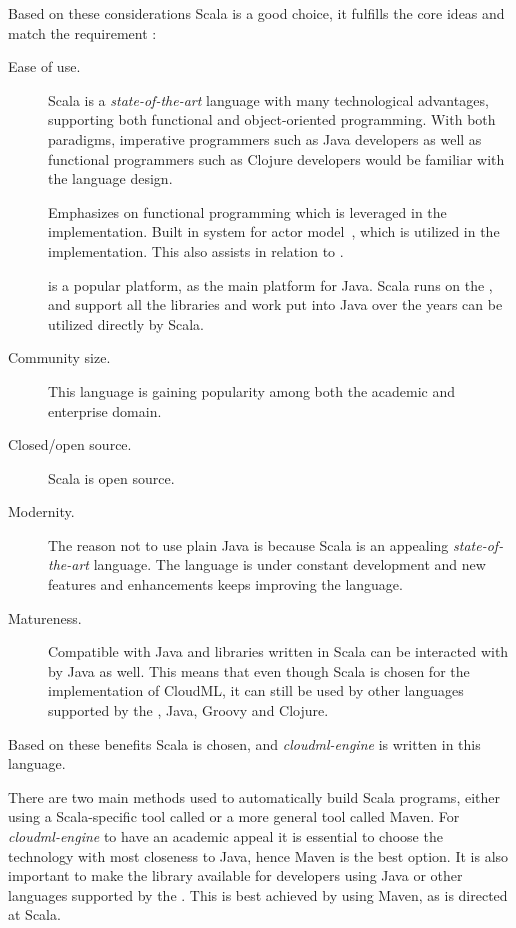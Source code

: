 Based on these considerations Scala is a good choice, it fulfills the core ideas and match
the requirement :
\begin{description} 
  \item[Ease of use.]
    Scala is a \emph{state-of-the-art} language with many technological advantages,
    \eg supporting both functional and object-oriented programming.
    With both paradigms, imperative programmers such as Java developers as well as functional
    programmers such as Clojure developers would be familiar with the language design.
    
    Emphasizes on functional programming which is leveraged in the implementation.
    Built in system for actor model~\cite{actors:haller07}, which is utilized in the implementation.
    This also assists in relation to .

     is a popular platform, as the main platform for Java.
    Scala runs on the , and support all the libraries and work put into Java
    over the years can be utilized directly by Scala.
  \item[Community size.]
    This language is gaining popularity among both the academic and enterprise domain.
  \item[Closed/open source.] Scala is open source.
  \item[Modernity.]
    The reason not to use plain Java is because Scala is an appealing \emph{state-of-the-art} language.
    The language is under constant development and new features and enhancements keeps improving
    the language.
  \item[Matureness.]
    Compatible with Java and libraries written in Scala can be interacted with by Java as well.
    This means that even though Scala is chosen for the implementation of CloudML,
    it can still be used by other languages supported by the ,
    \eg Java, Groovy and Clojure.
\end{description}
Based on these benefits Scala is chosen, and \emph{cloudml-engine} is written in this language.





There are two main methods used to automatically build Scala programs, 
either using a Scala-specific tool called  or a more general tool called Maven. 
For \emph{cloudml-engine} to have an academic appeal it is essential to choose the technology
with most closeness to Java, hence Maven is the best option.
It is also important to make the library available for developers using Java or other
languages supported by the .
This is best achieved by using Maven, as  is directed at Scala.

